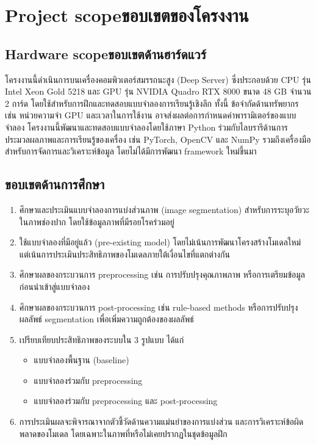 \section{\ifenglish Project scope\else ขอบเขตของโครงงาน\fi}

\subsection{\ifenglish Hardware scope\else ขอบเขตด้านฮาร์ดแวร์\fi}
โครงงานนี้ดำเนินการบนเครื่องคอมพิวเตอร์สมรรถนะสูง (Deep Server) ซึ่งประกอบด้วย CPU รุ่น Intel Xeon Gold 5218 และ GPU รุ่น NVIDIA Quadro RTX 8000 ขนาด 48 GB จำนวน 2 การ์ด โดยใช้สำหรับการฝึกและทดสอบแบบจำลองการเรียนรู้เชิงลึก ทั้งนี้ ข้อจำกัดด้านทรัพยากร เช่น หน่วยความจำ GPU และเวลาในการใช้งาน อาจส่งผลต่อการกำหนดค่าพารามิเตอร์ของแบบจำลอง
โครงงานนี้พัฒนาและทดสอบแบบจำลองโดยใช้ภาษา Python ร่วมกับไลบรารีด้านการประมวลผลภาพและการเรียนรู้ของเครื่อง เช่น PyTorch, OpenCV และ NumPy รวมถึงเครื่องมือสำหรับการจัดการและวิเคราะห์ข้อมูล โดยไม่ได้มีการพัฒนา framework ใหม่ขึ้นมา
\subsection{ขอบเขตด้านการศึกษา}
\begin{enumerate}
    \item ศึกษาและประเมินแบบจำลองการแบ่งส่วนภาพ (image segmentation) สำหรับการระบุอวัยวะในภาพช่องปาก โดยใช้ข้อมูลภาพที่มีรอยโรคร่วมอยู่
    \item ใช้แบบจำลองที่มีอยู่แล้ว (pre-existing model) โดยไม่เน้นการพัฒนาโครงสร้างโมเดลใหม่ แต่เน้นการประเมินประสิทธิภาพของโมเดลภายใต้เงื่อนไขที่แตกต่างกัน
    \item ศึกษาผลของกระบวนการ preprocessing เช่น การปรับปรุงคุณภาพภาพ หรือการเตรียมข้อมูล ก่อนนำเข้าสู่แบบจำลอง
    \item ศึกษาผลของกระบวนการ post-processing เช่น rule-based methods หรือการปรับปรุงผลลัพธ์ segmentation เพื่อเพิ่มความถูกต้องของผลลัพธ์
    \item เปรียบเทียบประสิทธิภาพของระบบใน 3 รูปแบบ ได้แก่
        \begin{itemize}
            \item แบบจำลองพื้นฐาน (baseline)
            \item แบบจำลองร่วมกับ preprocessing
            \item แบบจำลองร่วมกับ preprocessing และ post-processing
        \end{itemize}
    \item การประเมินผลจะพิจารณาจากตัวชี้วัดด้านความแม่นยำของการแบ่งส่วน และการวิเคราะห์ข้อผิดพลาดของโมเดล โดยเฉพาะในภาพที่หรือไม่เคยปรากฏในชุดข้อมูลฝึก
\end{enumerate}


